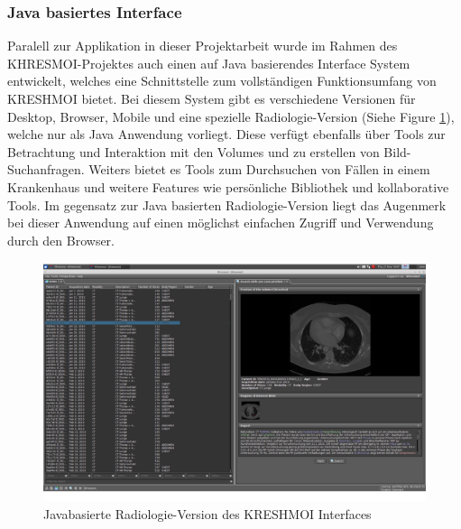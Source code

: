 \subsubsection{Java basiertes Interface}
\label{sec:Java basiertes Interface}
Paralell zur Applikation in dieser Projektarbeit wurde im Rahmen des KHRESMOI-Projektes auch einen auf Java basierendes Interface System entwickelt,
welches eine Schnittstelle zum vollständigen Funktionsumfang von KRESHMOI bietet.
Bei diesem System gibt es verschiedene Versionen für Desktop, Browser, Mobile und eine spezielle Radiologie-Version (Siehe Figure \ref{fig:javabased_interface}), welche nur als Java Anwendung vorliegt.
Diese verfügt ebenfalls über Tools zur Betrachtung und Interaktion mit den Volumes und zu erstellen von Bild-Suchanfragen.
Weiters bietet es Tools zum Durchsuchen von Fällen in einem Krankenhaus und weitere Features wie persönliche Bibliothek und kollaborative Tools.
Im gegensatz zur Java basierten Radiologie-Version liegt das Augenmerk bei dieser Anwendung auf einen möglichst einfachen Zugriff und Verwendung durch den Browser.
\begin{figure}[t]
	\centering
	\includegraphics[width=0.8\linewidth]{img/c1_javainterface_indexview.png}
	\caption{Javabasierte Radiologie-Version des KRESHMOI Interfaces}
	\label{fig:javabased_interface}
\end{figure}

